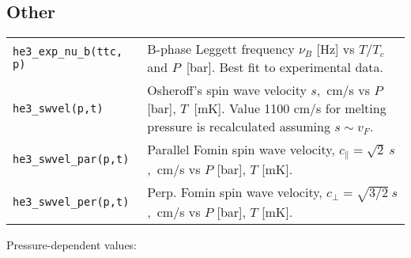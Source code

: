 \documentclass[a4paper]{article}
\begin{document}
\subsection*{Other}

\medskip
\begin{tabular}{lp{9cm}}
\tt he3\_exp\_nu\_b(ttc, p)     &B-phase Leggett frequency $\nu_B$ [Hz] vs
                                 $T/T_c$ and $P$~[bar].\newline
                                  Best fit to experimental data.\\
\tt he3\_swvel(p,t) & Osheroff's spin wave velocity $s$,~cm/s
                      vs $P$ [bar], $T$~[mK]. Value 1100 cm/s for
                      melting pressure is recalculated assuming $s\sim v_F$.\\
\tt he3\_swvel\_par(p,t) & Parallel Fomin spin wave velocity,\newline
                          $c_\parallel = \sqrt{2}\ s$,~cm/s vs $P$ [bar], $T$ [mK].\\
\tt he3\_swvel\_per(p,t) & Perp. Fomin spin wave velocity,\newline
                          $c_\perp = \sqrt{3/2}\ s$,~cm/s vs $P$ [bar], $T$ [mK].\\

\end{tabular}
\medskip


\eject
Pressure-dependent values:
\medskip

{\small}
\end{document}

